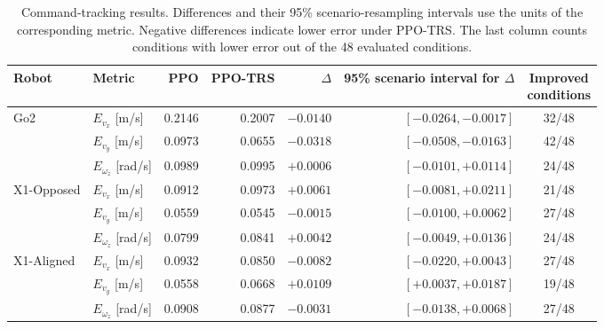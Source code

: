 \begin{table}[t]
    \centering
    \small
    \setlength{\tabcolsep}{4pt}
    \renewcommand{\arraystretch}{1.15}
    \caption{Command-tracking results. Differences and their 95\% scenario-resampling intervals use the units of the corresponding metric. Negative differences indicate lower error under PPO-TRS. The last column counts conditions with lower error out of the 48 evaluated conditions.}
    \label{tab:loco_tracking_statistics}
    \begin{tabular}{@{}llrrrrc@{}}
        \toprule
        Robot & Metric & PPO & PPO-TRS & $\Delta$ & \shortstack{95\% scenario\\interval for $\Delta$} & \shortstack{Improved\\conditions} \\
        \midrule
        \multirow{3}{*}{Go2}
        & $E_{v_x}$ [m/s] & 0.2146 & 0.2007 & $-0.0140$ & $[-0.0264,-0.0017]$ & 32/48 \\
        & $E_{v_y}$ [m/s] & 0.0973 & 0.0655 & $-0.0318$ & $[-0.0508,-0.0163]$ & 42/48 \\
        & $E_{\omega_z}$ [rad/s] & 0.0989 & 0.0995 & $+0.0006$ & $[-0.0101,+0.0114]$ & 24/48 \\
        \midrule
        \multirow{3}{*}{X1-Opposed}
        & $E_{v_x}$ [m/s] & 0.0912 & 0.0973 & $+0.0061$ & $[-0.0081,+0.0211]$ & 21/48 \\
        & $E_{v_y}$ [m/s] & 0.0559 & 0.0545 & $-0.0015$ & $[-0.0100,+0.0062]$ & 27/48 \\
        & $E_{\omega_z}$ [rad/s] & 0.0799 & 0.0841 & $+0.0042$ & $[-0.0049,+0.0136]$ & 24/48 \\
        \midrule
        \multirow{3}{*}{X1-Aligned}
        & $E_{v_x}$ [m/s] & 0.0932 & 0.0850 & $-0.0082$ & $[-0.0220,+0.0043]$ & 27/48 \\
        & $E_{v_y}$ [m/s] & 0.0558 & 0.0668 & $+0.0109$ & $[+0.0037,+0.0187]$ & 19/48 \\
        & $E_{\omega_z}$ [rad/s] & 0.0908 & 0.0877 & $-0.0031$ & $[-0.0138,+0.0068]$ & 27/48 \\
        \bottomrule
    \end{tabular}
\end{table}

